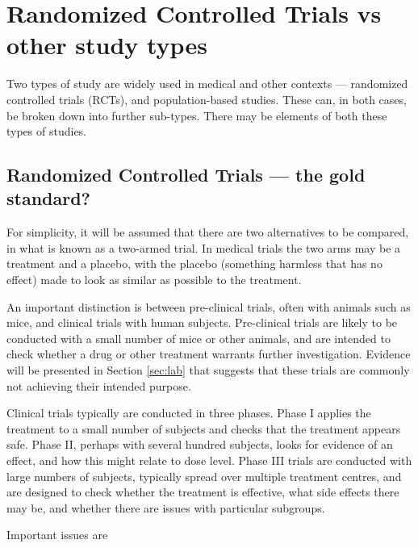 \documentclass[
  10ptls,
  b5paper]{book}
\begin{document}
\section{Randomized Controlled Trials vs other study types}\label{ss:rct}

Two types of study are widely used in medical and other contexts --- randomized controlled trials (RCTs), and population-based studies. These can, in both cases, be broken down into further sub-types. There may be elements of both these types of studies.

\subsection*{Randomized Controlled Trials --- the gold standard?}\label{randomized-controlled-trials-the-gold-standard}

For simplicity, it will be assumed that there are two alternatives to be compared, in what is known as a two-armed trial. In medical trials the two arms may be a treatment and a placebo, with the placebo (something harmless that has no effect) made to look as similar as possible to the treatment.

An important distinction is between pre-clinical trials, often with animals such as mice, and clinical trials with human subjects. Pre-clinical trials are likely to be conducted with a small number of mice or other animals, and are intended to check whether a drug or other treatment warrants further investigation. Evidence will be presented in Section \ref{sec:lab} that suggests that these trials are commonly not achieving their intended purpose.

Clinical trials typically are conducted in three phases. Phase I applies the treatment to a small number of subjects and checks that the treatment appears safe. Phase II, perhaps with several hundred subjects, looks for evidence of an effect, and how this might relate to dose level. Phase III trials are conducted with large numbers of subjects, typically spread over multiple treatment centres, and are designed to check whether the treatment is effective, what side effects there may be, and whether there are issues with particular subgroups.

Important issues are
\end{document}
